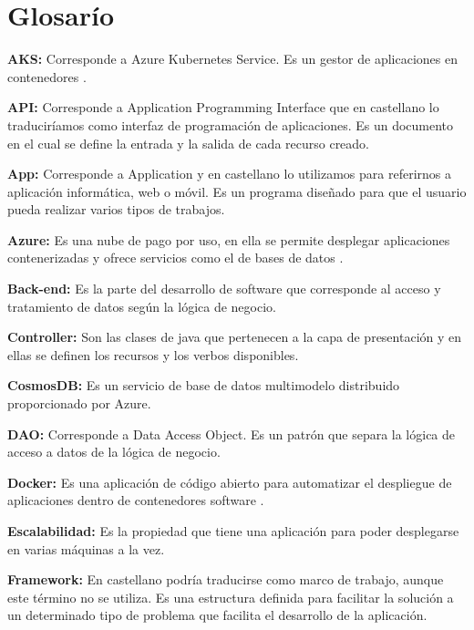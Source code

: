 \documentclass[12pt]{report} %
\begin{document}
	\newpage %
	\thispagestyle{empty}
	\mbox{}

	
\chapter*{Glosarío}

\setcounter{page}{7}

\textbf{AKS:} Corresponde a Azure Kubernetes Service. Es un gestor de aplicaciones en contenedores \cite{kubernetes}.

\textbf{API:} Corresponde a Application Programming Interface que en castellano lo traduciríamos como interfaz de programación de aplicaciones. Es un documento en el cual se define la entrada y la salida de cada recurso creado.

\textbf{App:} Corresponde a Application y en castellano lo utilizamos para referirnos a aplicación informática, web o móvil. Es un programa diseñado para que el usuario pueda realizar varios tipos de trabajos.

\textbf{Azure:} Es una nube de pago por uso, en ella se permite desplegar aplicaciones contenerizadas y ofrece servicios como el de bases de datos \cite{Azure}. 

\textbf{Back-end:} Es la parte del desarrollo de software que corresponde al acceso y tratamiento de datos según la lógica de negocio.

\textbf{Controller:} Son las clases de java que pertenecen a la capa de presentación y en ellas se definen los recursos y los verbos disponibles.

\textbf{CosmosDB:} Es un servicio de base de datos multimodelo distribuido proporcionado por Azure.

\textbf{DAO:} Corresponde a Data Access Object. Es un patrón que separa la lógica de acceso a datos de la lógica de negocio.

\textbf{Docker:} Es una aplicación de código abierto para automatizar el despliegue de aplicaciones dentro de contenedores software \cite{Docker}.

\textbf{Escalabilidad:} Es la propiedad que tiene una aplicación para poder desplegarse en varias máquinas a la vez.

\textbf{Framework:} En castellano podría traducirse como marco de trabajo, aunque este término no se utiliza. Es una estructura definida para facilitar la solución a un determinado tipo de problema que facilita el desarrollo de la aplicación. 
\end{document}
